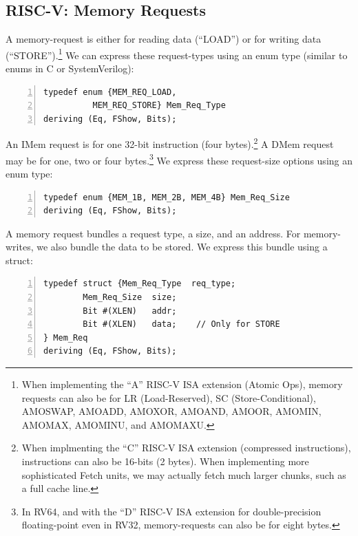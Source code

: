
\subsection{RISC-V: Memory Requests}

\label{Sec_Mem_Req}


A memory-request is either for reading data (``LOAD'') or for writing
data (``STORE'').\footnote{When implementing the ``A'' RISC-V ISA
extension (Atomic Ops), memory requests can also be for LR
(Load-Reserved), SC (Store-Conditional), AMOSWAP, AMOADD, AMOXOR,
AMOAND, AMOOR, AMOMIN, AMOMAX, AMOMINU, and AMOMAXU.}  We can express
these request-types using an enum type (similar to enums in C or
SystemVerilog):

\begin{Verbatim}[frame=single, numbers=left]
typedef enum {MEM_REQ_LOAD,
	      MEM_REQ_STORE} Mem_Req_Type
deriving (Eq, FShow, Bits);
\end{Verbatim}

An IMem request is for one 32-bit instruction (four
bytes).\footnote{When implmenting the ``C'' RISC-V ISA extension
(compressed instructions), instructions can also be 16-bits (2 bytes).
When implementing more sophisticated Fetch units, we may actually
fetch much larger chunks, such as a full cache line.}  A DMem request
may be for one, two or four bytes.\footnote{In RV64, and with the
``D'' RISC-V ISA extension for double-precision floating-point even in
RV32, memory-requests can also be for eight bytes.}  We express these
request-size options using an enum type:

\begin{Verbatim}[frame=single, numbers=left]
typedef enum {MEM_1B, MEM_2B, MEM_4B} Mem_Req_Size
deriving (Eq, FShow, Bits);
\end{Verbatim}

A memory request bundles a request type, a size, and an address.  For
memory-writes, we also bundle the data to be stored.  We express this
bundle using a struct:

\begin{Verbatim}[frame=single, numbers=left]
typedef struct {Mem_Req_Type  req_type;
		Mem_Req_Size  size;
		Bit #(XLEN)   addr;
		Bit #(XLEN)   data;    // Only for STORE
} Mem_Req
deriving (Eq, FShow, Bits);
\end{Verbatim}

